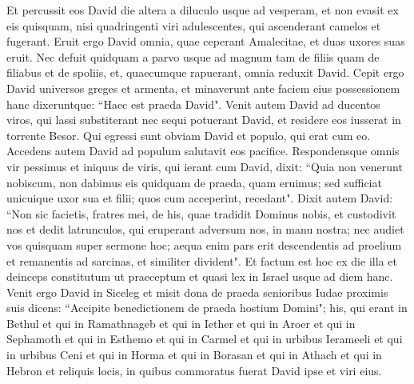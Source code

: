 \begin{biblechapter}
\verse Et percussit eos David die altera a diluculo usque ad vesperam, et non evasit ex eis quisquam, nisi quadringenti viri adulescentes, qui ascenderant camelos et fugerant. 
\verse Eruit ergo David omnia, quae ceperant Amalecitae, et duas uxores suas eruit. 
\verse Nec defuit quidquam a parvo usque ad magnum tam de filiis quam de filiabus et de spoliis, et, quaecumque rapuerant, omnia reduxit David. 
\verse Cepit ergo David universos greges et armenta, et minaverunt ante faciem eius possessionem hanc dixeruntque: “Haec est praeda David". 
\verse Venit autem David ad ducentos viros, qui lassi substiterant nec sequi potuerant David, et residere eos iusserat in torrente Besor. Qui egressi sunt obviam David et populo, qui erat cum eo. Accedens autem David ad populum salutavit eos pacifice. 
\verse Respondensque omnis vir pessimus et iniquus de viris, qui ierant cum David, dixit: “Quia non venerunt nobiscum, non dabimus eis quidquam de praeda, quam eruimus; sed sufficiat unicuique uxor sua et filii; quos cum acceperint, recedant". 
\verse Dixit autem David: “Non sic facietis, fratres mei, de his, quae tradidit Dominus nobis, et custodivit nos et dedit latrunculos, qui eruperant adversum nos, in manu nostra; 
\verse nec audiet vos quisquam super sermone hoc; aequa enim pars erit descendentis ad proelium et remanentis ad sarcinas, et similiter divident". 
\verse Et factum est hoc ex die illa et deinceps constitutum ut praeceptum et quasi lex in Israel usque ad diem hanc. 
\verse Venit ergo David in Siceleg et misit dona de praeda senioribus Iudae proximis suis dicens: “Accipite benedictionem de praeda hostium Domini"; 
\verse his, qui erant in Bethul et qui in Ramathnageb et qui in Iether 
\verse et qui in Aroer et qui in Sephamoth et qui in Esthemo 
\verse et qui in Carmel et qui in urbibus Ierameeli et qui in urbibus Ceni 
\verse et qui in Horma et qui in Borasan et qui in Athach 
\verse et qui in Hebron et reliquis locis, in quibus commoratus fuerat David ipse et viri eius. 
\end{biblechapter}

